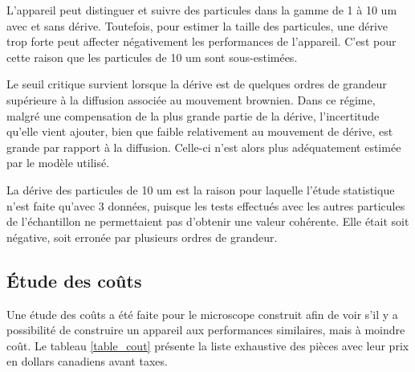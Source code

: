 \documentclass[11pt,letterpaper]{article}
\begin{document}
L'appareil peut distinguer et suivre des particules dans la gamme de 1 à 10 um avec et sans dérive.
Toutefois, pour estimer la taille des particules, une dérive trop forte peut affecter négativement 
les performances de l'appareil. C'est pour cette raison que les particules de 10 um sont 
sous-estimées. 

Le seuil critique survient lorsque la dérive est de quelques ordres de grandeur supérieure à la 
diffusion associée au mouvement brownien. Dans ce régime, malgré une 
compensation de la plus grande partie de la dérive, l'incertitude qu'elle vient ajouter, bien que faible
relativement au mouvement de dérive, est grande par rapport à la diffusion. Celle-ci n'est alors plus 
adéquatement estimée par le modèle utilisé. 



La dérive des particules de 10 um est la raison pour laquelle l'étude statistique n'est faite qu'avec 3 
données, puisque les tests effectués avec les autres particules de l'échantillon ne permettaient pas 
d'obtenir une valeur cohérente. Elle était soit négative, soit erronée par plusieurs ordres de grandeur.






\subsection{Étude des coûts}

Une étude des coûts a été faite pour le microscope construit afin de voir s'il y a possibilité
de construire un appareil aux performances similaires, mais à moindre coût. Le tableau \ref{table_cout}
présente la liste exhaustive des pièces avec leur prix en dollars canadiens avant taxes.
\end{document}
